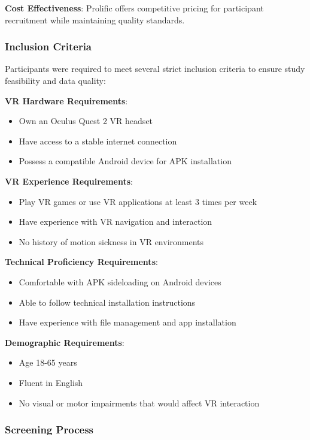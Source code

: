 \documentclass[12pt]{article}
\begin{document}
\textbf{Cost Effectiveness}: Prolific offers competitive pricing for participant recruitment while maintaining quality standards.

\subsubsection{Inclusion Criteria}

Participants were required to meet several strict inclusion criteria to ensure study feasibility and data quality:

\textbf{VR Hardware Requirements}:
\begin{itemize}
    \item Own an Oculus Quest 2 VR headset
    \item Have access to a stable internet connection
    \item Possess a compatible Android device for APK installation
\end{itemize}

\textbf{VR Experience Requirements}:
\begin{itemize}
    \item Play VR games or use VR applications at least 3 times per week
    \item Have experience with VR navigation and interaction
    \item No history of motion sickness in VR environments
\end{itemize}

\textbf{Technical Proficiency Requirements}:
\begin{itemize}
    \item Comfortable with APK sideloading on Android devices
    \item Able to follow technical installation instructions
    \item Have experience with file management and app installation
\end{itemize}

\textbf{Demographic Requirements}:
\begin{itemize}
    \item Age 18-65 years
    \item Fluent in English
    \item No visual or motor impairments that would affect VR interaction
\end{itemize}

\subsubsection{Screening Process}
\end{document}
